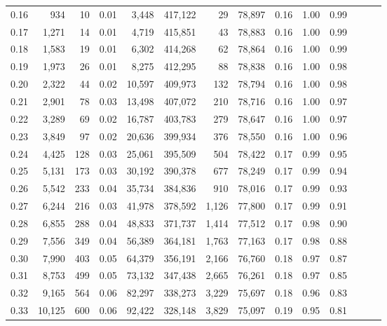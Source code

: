 \begin{tabular}{rrrrrrrrrrrrrr}
0.16 &     934 &     10 &  0.01 &    3,448 &  417,122 &      29 &  78,897 &  0.16 &  1.00 &      0.99 \\
0.17 &   1,271 &     14 &  0.01 &    4,719 &  415,851 &      43 &  78,883 &  0.16 &  1.00 &      0.99 \\
0.18 &   1,583 &     19 &  0.01 &    6,302 &  414,268 &      62 &  78,864 &  0.16 &  1.00 &      0.99 \\
0.19 &   1,973 &     26 &  0.01 &    8,275 &  412,295 &      88 &  78,838 &  0.16 &  1.00 &      0.98 \\
0.20 &   2,322 &     44 &  0.02 &   10,597 &  409,973 &     132 &  78,794 &  0.16 &  1.00 &      0.98 \\
0.21 &   2,901 &     78 &  0.03 &   13,498 &  407,072 &     210 &  78,716 &  0.16 &  1.00 &      0.97 \\
0.22 &   3,289 &     69 &  0.02 &   16,787 &  403,783 &     279 &  78,647 &  0.16 &  1.00 &      0.97 \\
0.23 &   3,849 &     97 &  0.02 &   20,636 &  399,934 &     376 &  78,550 &  0.16 &  1.00 &      0.96 \\
0.24 &   4,425 &    128 &  0.03 &   25,061 &  395,509 &     504 &  78,422 &  0.17 &  0.99 &      0.95 \\
0.25 &   5,131 &    173 &  0.03 &   30,192 &  390,378 &     677 &  78,249 &  0.17 &  0.99 &      0.94 \\
0.26 &   5,542 &    233 &  0.04 &   35,734 &  384,836 &     910 &  78,016 &  0.17 &  0.99 &      0.93 \\
0.27 &   6,244 &    216 &  0.03 &   41,978 &  378,592 &   1,126 &  77,800 &  0.17 &  0.99 &      0.91 \\
0.28 &   6,855 &    288 &  0.04 &   48,833 &  371,737 &   1,414 &  77,512 &  0.17 &  0.98 &      0.90 \\
0.29 &   7,556 &    349 &  0.04 &   56,389 &  364,181 &   1,763 &  77,163 &  0.17 &  0.98 &      0.88 \\
0.30 &   7,990 &    403 &  0.05 &   64,379 &  356,191 &   2,166 &  76,760 &  0.18 &  0.97 &      0.87 \\
0.31 &   8,753 &    499 &  0.05 &   73,132 &  347,438 &   2,665 &  76,261 &  0.18 &  0.97 &      0.85 \\
0.32 &   9,165 &    564 &  0.06 &   82,297 &  338,273 &   3,229 &  75,697 &  0.18 &  0.96 &      0.83 \\
0.33 &  10,125 &    600 &  0.06 &   92,422 &  328,148 &   3,829 &  75,097 &  0.19 &  0.95 &      0.81 \\

\end{tabular}
